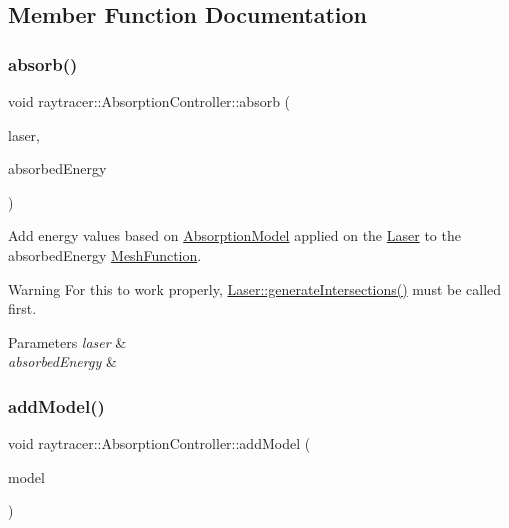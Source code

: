 \subsection{Member Function Documentation}
\mbox{\label{classraytracer_1_1AbsorptionController_a5190d4b54293231350d30f3bf3acc59a}} 
\subsubsection{\texorpdfstring{absorb()}{absorb()}}
{\footnotesize\ttfamily void raytracer\+::\+Absorption\+Controller\+::absorb (\begin{DoxyParamCaption}\item[{const \hyperlink{classraytracer_1_1Laser}{Laser} \&}]{laser,  }\item[{\hyperlink{classraytracer_1_1MeshFunction}{Mesh\+Function} \&}]{absorbed\+Energy }\end{DoxyParamCaption})}



Add energy values based on \hyperlink{classraytracer_1_1AbsorptionModel}{Absorption\+Model} applied on the \hyperlink{classraytracer_1_1Laser}{Laser} to the absorbed\+Energy \hyperlink{classraytracer_1_1MeshFunction}{Mesh\+Function}. 

\begin{DoxyWarning}{Warning}
For this to work properly, \hyperlink{classraytracer_1_1Laser_a40fd2b112fb1de646861d7e93ac303e3}{Laser\+::generate\+Intersections()} must be called first. 
\end{DoxyWarning}

\begin{DoxyParams}{Parameters}
{\em laser} & \\
\hline
{\em absorbed\+Energy} & \\
\hline
\end{DoxyParams}
\mbox{\label{classraytracer_1_1AbsorptionController_a4bde685a4fe1a5adc873e1483d91e2ae}} 
\subsubsection{\texorpdfstring{add\+Model()}{addModel()}}
{\footnotesize\ttfamily void raytracer\+::\+Absorption\+Controller\+::add\+Model (\begin{DoxyParamCaption}\item[{const \hyperlink{classraytracer_1_1AbsorptionModel}{Absorption\+Model} $\ast$}]{model }\end{DoxyParamCaption})}




